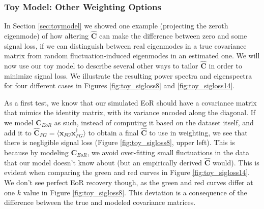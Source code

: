 \documentclass[preprint2,numberedappendix,tighten]{aastex6}  %
\begin{document}
\subsubsection{Toy Model: Other Weighting Options}
\label{sec:otherweight}

In Section \ref{sec:toymodel} we showed one example (projecting the zeroth eigenmode) of how altering $\hat{\textbf{C}}$ can make the difference between zero and some signal loss, if we can distinguish between real eigenmodes in a true covariance matrix from random fluctuation-induced eigenmodes in an estimated one. We will now use our toy model to describe several other ways to tailor $\hat{\textbf{C}}$ in order to minimize signal loss. We illustrate the resulting power spectra and eigenspectra for four different cases in Figures \ref{fig:toy_sigloss8} and \ref{fig:toy_sigloss14}.

As a first test, we know that our simulated EoR should have a covariance matrix that mimics the identity matrix, with its variance encoded along the diagonal. If we model $\textbf{C}_{EoR}$ as such, instead of computing it based on the dataset itself, and add it to $\hat{\textbf{C}}_{FG} = \langle\textbf{x}_{FG}\textbf{x}_{FG}^{\dagger}\rangle$ to obtain a final $\hat{\textbf{C}}$ to use in weighting, we see that there is negligible signal loss (Figure \ref{fig:toy_sigloss8}, upper left). This is because by modeling $\textbf{C}_{EoR}$, we avoid over-fitting small fluctuations in the data that our model doesn't know about (but an empirically derived $\hat{\textbf{C}}$ would). This is evident when comparing the green and red curves in Figure \ref{fig:toy_sigloss14}. We don't see perfect EoR recovery though, as the green and red curves differ at one $k$ value in Figure \ref{fig:toy_sigloss8}. This deviation is a consequence of the difference between the true and modeled covariance matrices.
\end{document}
